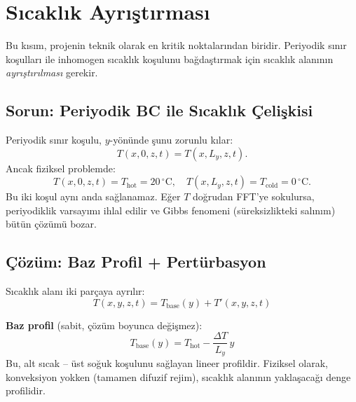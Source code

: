 

\section{Sıcaklık Ayrıştırması}
\label{sec:sicaklik_ayristirma}

Bu kısım, projenin teknik olarak en kritik noktalarından biridir. Periyodik sınır koşulları ile inhomogen sıcaklık koşulunu bağdaştırmak için sıcaklık alanının \textit{ayrıştırılması} gerekir.

\subsection{Sorun: Periyodik BC ile Sıcaklık Çelişkisi}

Periyodik sınır koşulu, $y$-yönünde şunu zorunlu kılar:
\begin{equation}
    T(x, 0, z, t) = T(x, L_y, z, t).
    \label{eq:periodic_T}
\end{equation}
Ancak fiziksel problemde:
\begin{equation}
    T(x, 0, z, t) = T_{\text{hot}} = 20\,^{\circ}\mathrm{C}, \quad
    T(x, L_y, z, t) = T_{\text{cold}} = 0\,^{\circ}\mathrm{C}.
\end{equation}
Bu iki koşul aynı anda sağlanamaz. Eğer $T$ doğrudan FFT'ye sokulursa, periyodiklik varsayımı ihlal edilir ve Gibbs fenomeni (süreksizlikteki salınım) bütün çözümü bozar.

\subsection{Çözüm: Baz Profil + Pertürbasyon}

Sıcaklık alanı iki parçaya ayrılır:
\begin{equation}
    \boxed{T(x, y, z, t) = T_{\text{base}}(y) + T'(x, y, z, t)}
    \label{eq:T_decomposition}
\end{equation}

\textbf{Baz profil} (sabit, çözüm boyunca değişmez):
\begin{equation}
    T_{\text{base}}(y) = T_{\text{hot}} - \frac{\Delta T}{L_y} \, y
    \label{eq:T_base}
\end{equation}
Bu, alt sıcak -- üst soğuk koşulunu sağlayan lineer profildir. Fiziksel olarak, konveksiyon yokken (tamamen difuzif rejim), sıcaklık alanının yaklaşacağı denge profilidir.

